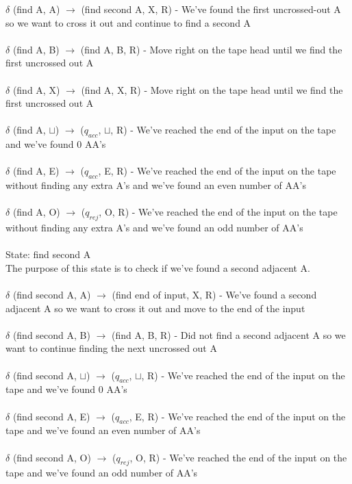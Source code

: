 \documentclass[11pt]{article}
\theoremstyle{definition}
\theoremstyle{theorem}
\begin{document}
\noindent$\delta$ (find A, A) $\rightarrow$ (find second A, X, R) - We've found the first uncrossed-out A so we want to cross it out and continue to find a second A \\ ~ \\
\noindent$\delta$ (find A, B) $\rightarrow$ (find A, B, R) - Move right on the tape head until we find the first uncrossed out A \\ ~ \\
$\delta$ (find A, X) $\rightarrow$ (find A, X, R) - Move right on the tape head until we find the first uncrossed out A \\ ~ \\
$\delta$ (find A, $\sqcup$) $\rightarrow$ ($q_{acc}$, $\sqcup$, R) - We've reached the end of the input on the tape and we've found 0 AA's \\ ~ \\
$\delta$ (find A, E) $\rightarrow$ ($q_{acc}$, E, R) - We've reached the end of the input on the tape without finding any extra A's and we've found an even number of AA's \\ ~ \\
$\delta$ (find A, O) $\rightarrow$ ($q_{rej}$, O, R) - We've reached the end of the input on the tape without finding any extra A's and we've found an odd number of AA's \\ ~ \\

\noindent State: find second A \\ 
The purpose of this state is to check if we've found a second adjacent A. \\ ~ \\

\noindent$\delta$ (find second A, A) $\rightarrow$ (find end of input, X, R) - We've found a second adjacent A so we want to cross it out and move to the end of the input\\ ~ \\
\noindent$\delta$ (find second A, B) $\rightarrow$ (find A, B, R) - Did not find a second adjacent A so we want to continue finding the next uncrossed out A \\ ~ \\
$\delta$ (find second A, $\sqcup$) $\rightarrow$ ($q_{acc}$, $\sqcup$, R) - We've reached the end of the input on the tape and we've found 0 AA's \\ ~ \\
$\delta$ (find second A, E) $\rightarrow$ ($q_{acc}$, E, R) - We've reached the end of the input on the tape and we've found an even number of AA's \\ ~ \\
$\delta$ (find second A, O) $\rightarrow$ ($q_{rej}$, O, R) - We've reached the end of the input on the tape and we've found an odd number of AA's \\ ~ \\
\end{document}
